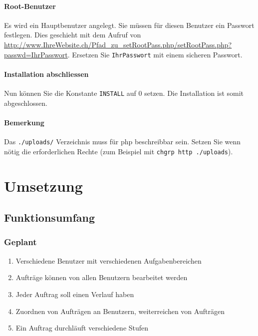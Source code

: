 \documentclass[ngerman, 12pt, pdftex]{scrartcl}[2006/07/30]
\begin{document}
	\paragraph{Root-Benutzer}
		Es wird ein Hauptbenutzer angelegt. Sie müssen für diesen Benutzer ein Passwort festlegen. 
		Dies geschieht mit dem Aufruf von \url{http://www.IhreWebsite.ch/Pfad_zu_setRootPass.php/setRootPass.php?passwd=IhrPasswort}.
		Ersetzen Sie \verb+IhrPasswort+ mit einem sicheren Passwort.
	\paragraph{Installation abschliessen}
		Nun können Sie die Konstante \verb+INSTALL+ auf 0 setzen. Die Installation ist somit abgeschlossen.
		\paragraph{Bemerkung}
    Das \verb+./uploads/+ Verzeichnis muss für php beschreibbar sein. Setzen Sie wenn nötig die erforderlichen Rechte
    (zum Beispiel mit \verb+chgrp http ./uploads+). 
  





\section{Umsetzung}
\subsection{Funktionsumfang}
	\subsubsection{Geplant}
		\begin{enumerate}
		\item Verschiedene Benutzer mit verschiedenen Aufgabenbereichen
		\item Aufträge können von allen Benutzern bearbeitet werden
		\item Jeder Auftrag soll einen Verlauf haben
		\item Zuordnen von Aufträgen an Benutzern, weiterreichen von Aufträgen
		\item Ein Auftrag durchläuft verschiedene Stufen
		\end{enumerate}
\end{document}
